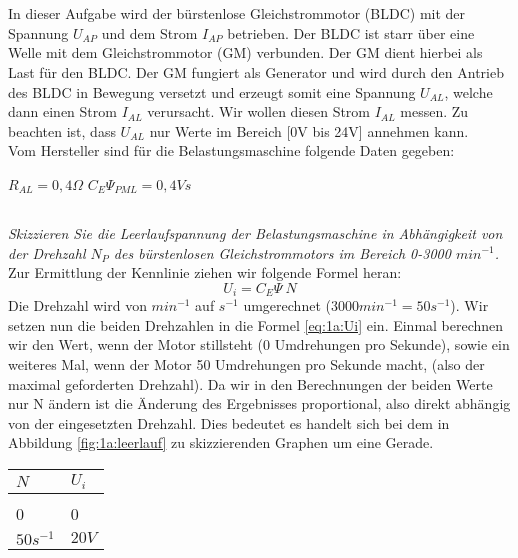 
\chapter{}\label{ch:auf1}
In dieser Aufgabe wird der bürstenlose Gleichstrommotor (BLDC) mit der Spannung $ U_{AP} $ und dem Strom $ I_{AP} $ betrieben. Der BLDC ist starr über eine Welle mit dem Gleichstrommotor (GM) verbunden. Der GM dient hierbei als Last für den BLDC. Der GM fungiert als Generator und wird durch den Antrieb des BLDC in Bewegung versetzt und erzeugt somit eine Spannung $ U_{AL} $, welche dann einen Strom $ I_{AL} $ verursacht. Wir wollen diesen Strom $ I_{AL} $ messen. Zu beachten ist, dass $ U_{AL} $ nur Werte im Bereich [0V bis 24V] annehmen kann. \\Vom Hersteller sind für die Belastungsmaschine folgende Daten gegeben:
\begin{center}
	$ R_{AL} = 0,4\Omega $ \hspace{2cm} $ C_{E}\Psi_{PML} = 0,4Vs $\\ 
\end{center}

\section{}\label{sec:1a}
\textit{Skizzieren Sie die Leerlaufspannung der Belastungsmaschine in Abhängigkeit von der Drehzahl $ N_{P} $ des bürstenlosen Gleichstrommotors im Bereich 0-3000 $ min^{-1} $.}\\
Zur Ermittlung der Kennlinie ziehen wir folgende Formel heran:
\begin{equation}
	U_{i} = C_{E}\Psi~N
	\label{eq:1a:Ui}
\end{equation}
Die Drehzahl wird von $ min^{-1} $ auf $ s^{-1} $ umgerechnet ($ 3000 min^{-1} = 50 s^{-1} $). Wir setzen nun die beiden Drehzahlen in die Formel \ref{eq:1a:Ui} ein. Einmal berechnen wir den Wert, wenn der Motor stillsteht (0 Umdrehungen pro Sekunde), sowie ein weiteres Mal, wenn der Motor 50 Umdrehungen pro Sekunde macht, (also der maximal geforderten Drehzahl). Da wir in den Berechnungen der beiden Werte nur N ändern ist die Änderung des Ergebnisses proportional, also direkt abhängig von der eingesetzten Drehzahl. Dies bedeutet es handelt sich bei dem in Abbildung \ref{fig:1a:leerlauf} zu skizzierenden Graphen um eine Gerade. 
\begin{table}[h]
	\centering
	\begin{tabular}{p{1.25cm} | p{1.25cm}}
		$ N $ & $ U_{i} $\\ \hline &\\[-1em]
		0 & 0 \\
		$ 50s^{-1} $ & $ 20V $
	\end{tabular}
\end{table}

